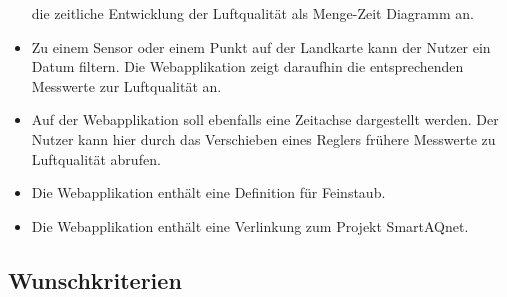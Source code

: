 \begin{itemize}
	die zeitliche Entwicklung der Luftqualität als Menge-Zeit Diagramm an.
	\item Zu einem \gls{Sensor} oder einem Punkt auf der Landkarte kann der Nutzer ein Datum filtern. 
	Die Webapplikation zeigt daraufhin die entsprechenden Messwerte zur Luftqualität an.
	\item Auf der Webapplikation soll ebenfalls eine Zeitachse dargestellt werden. 
	Der Nutzer kann hier durch das Verschieben eines Reglers frühere Messwerte zu Luftqualität abrufen. 
	\item Die Webapplikation enthält eine Definition für \gls{Feinstaub}.
	\item Die Webapplikation enthält eine Verlinkung zum Projekt \gls{SmartAQnet}. 
\end{itemize}
\subsection{Wunschkriterien}
